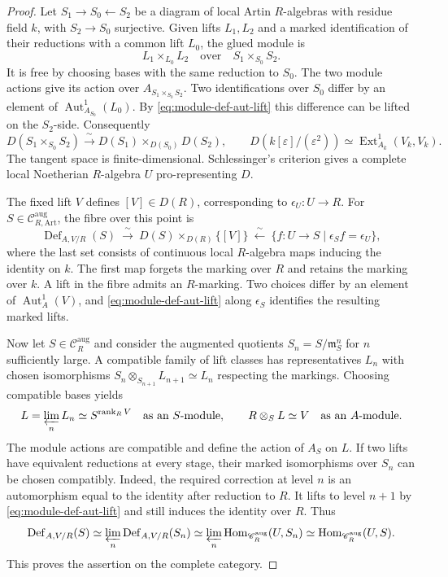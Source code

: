 \documentclass[12pt,a4paper,english,reqno]{amsart}
\numberwithin{equation}{section}
\theoremstyle{plain}
\theoremstyle{definition}
\begin{document}
\begin{proof}
Let $S_1\to S_0\leftarrow S_2$ be a diagram of local Artin
$R$-algebras with residue field $k$, with $S_2\to S_0$ surjective.
Given lifts $L_1,L_2$ and a marked identification of their
reductions with a common lift $L_0$, the glued module is
\[
 L_1\times_{L_0}L_2
        \quad\text{over}\quad S_1\times_{S_0}S_2 .
\]
It is free by choosing bases with the same reduction to $S_0$.
The two module actions give its action over
$A_{S_1\times_{S_0}S_2}$. Two identifications over $S_0$ differ by
an element of $\operatorname{Aut}^{1}_{A_{S_0}}(L_0)$.
By \eqref{eq:module-def-aut-lift} this difference can be lifted
on the $S_2$-side. Consequently
\[
 D(S_1\times_{S_0} S_2)
    \xrightarrow{\ \sim\ }D(S_1)\times_{D(S_0)}D(S_2),
 \qquad
 D(k[\varepsilon]/(\varepsilon^2))
      \simeq\operatorname{Ext}^1_{A_k}(V_k,V_k).
\]
The tangent space is finite-dimensional. Schlessinger's criterion
\cite[Theorem~2.11]{Schlessinger1968} gives a complete local
Noetherian $R$-algebra $U$ pro-representing $D$.

The fixed lift $V$ defines $[V]\in D(R)$, corresponding to
$\epsilon_U:U\to R$. For $S\in\mathcal C_{R,\mathrm{Art}}^{\mathrm{aug}}$,
the fibre over this point is
\[
 \operatorname{Def}_{A,V/R}(S)
 \ \xrightarrow{\ \sim\ }\
 D(S)\times_{D(R)}\{[V]\}
 \ \xleftarrow{\ \sim\ }\
 \{f:U\to S\mid \epsilon_S f=\epsilon_U\},
\]
where the last set consists of continuous local $R$-algebra maps
inducing the identity on $k$. The first map forgets the marking
over $R$ and retains the marking over $k$. A lift in the fibre
admits an $R$-marking. Two choices differ by an element of
$\operatorname{Aut}^{1}_{A}(V)$, and
\eqref{eq:module-def-aut-lift} along $\epsilon_S$ identifies the
resulting marked lifts.

Now let $S\in\mathcal C_R^{\mathrm{aug}}$ and consider the augmented
quotients $S_n=S/\mathfrak m_S^n$ for $n$ sufficiently large.
A compatible family of lift classes has representatives $L_n$
with chosen isomorphisms $S_n\otimes_{S_{n+1}}L_{n+1}\simeq L_n$
respecting the markings. Choosing compatible bases yields
\[
 L=\varprojlim_n L_n\simeq S^{\operatorname{rank}_R V}
 \quad\text{as an $S$-module},\qquad R\otimes_S L\simeq V
 \quad\text{as an $A$-module}.
\]
The module actions are compatible and define the action of $A_S$
on $L$. If two lifts have equivalent reductions at every stage,
their marked isomorphisms over $S_n$ can be chosen compatibly.
Indeed, the required correction at level $n$ is an automorphism
equal to the identity after reduction to $R$. It lifts to level
$n+1$ by \eqref{eq:module-def-aut-lift} and still induces the
identity over $R$. Thus
\[
 \operatorname{Def}_{A,V/R}(S)
 \simeq \varprojlim_n\operatorname{Def}_{A,V/R}(S_n)
 \simeq \varprojlim_n
       \operatorname{Hom}_{\mathcal C_R^{\mathrm{aug}}}(U,S_n)
 \simeq \operatorname{Hom}_{\mathcal C_R^{\mathrm{aug}}}(U,S).
\]
This proves the assertion on the complete category.
\end{proof}
\end{document}
